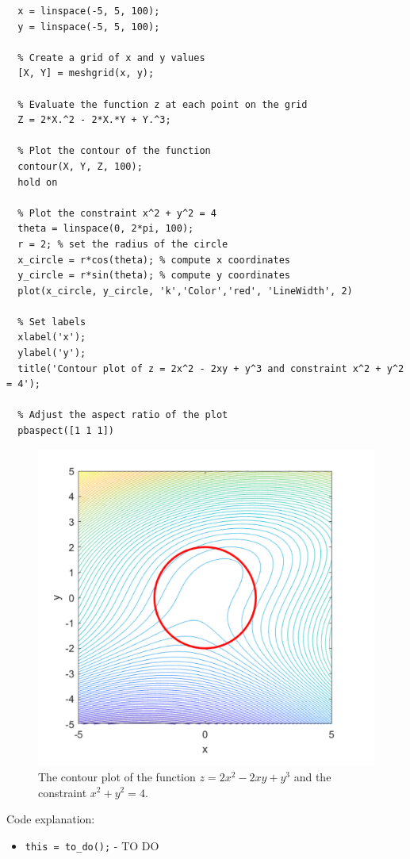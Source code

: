 \begin{lstlisting}[style=Matlab-editor]
  % Define the range of values for x and y
  x = linspace(-5, 5, 100);
  y = linspace(-5, 5, 100);
  
  % Create a grid of x and y values
  [X, Y] = meshgrid(x, y);
  
  % Evaluate the function z at each point on the grid
  Z = 2*X.^2 - 2*X.*Y + Y.^3;
  
  % Plot the contour of the function
  contour(X, Y, Z, 100);
  hold on
  
  % Plot the constraint x^2 + y^2 = 4
  theta = linspace(0, 2*pi, 100);
  r = 2; % set the radius of the circle
  x_circle = r*cos(theta); % compute x coordinates
  y_circle = r*sin(theta); % compute y coordinates
  plot(x_circle, y_circle, 'k','Color','red', 'LineWidth', 2)
  
  % Set labels
  xlabel('x');
  ylabel('y');
  title('Contour plot of z = 2x^2 - 2xy + y^3 and constraint x^2 + y^2 = 4');
  
  % Adjust the aspect ratio of the plot
  pbaspect([1 1 1])  
\end{lstlisting}

\begin{figure}[H]
  \centering
  \includegraphics[width=12cm]{graphics/2b.png}
  \caption{The contour plot of the function $z = 2x^2 - 2xy + y^3$ and the constraint $x^2 + y^2 = 4$.}
\end{figure}

\vspace*{1cm}

Code explanation:
\begin{itemize}
  \item \verb!this = to_do();! - TO DO
\end{itemize}

\vspace*{2cm}